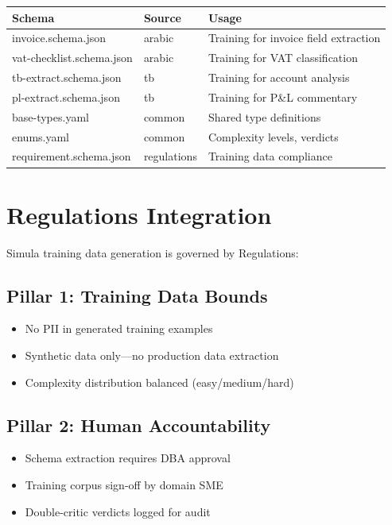 \begin{tabularx}{\linewidth}{@{}l l X@{}}
\toprule
\textbf{Schema} & \textbf{Source} & \textbf{Usage} \\
\midrule
invoice.schema.json & arabic & Training for invoice field extraction \\
vat-checklist.schema.json & arabic & Training for VAT classification \\
tb-extract.schema.json & tb & Training for account analysis \\
pl-extract.schema.json & tb & Training for P\&L commentary \\
base-types.yaml & common & Shared type definitions \\
enums.yaml & common & Complexity levels, verdicts \\
requirement.schema.json & regulations & Training data compliance \\
\bottomrule
\end{tabularx}

\section{Regulations Integration}
\label{sec:reg-integration}

Simula training data generation is governed by Regulations:

\subsection{Pillar 1: Training Data Bounds}

\begin{itemize}
  \item No PII in generated training examples
  \item Synthetic data only---no production data extraction
  \item Complexity distribution balanced (easy/medium/hard)
\end{itemize}

\subsection{Pillar 2: Human Accountability}

\begin{itemize}
  \item Schema extraction requires DBA approval
  \item Training corpus sign-off by domain SME
  \item Double-critic verdicts logged for audit
\end{itemize}

